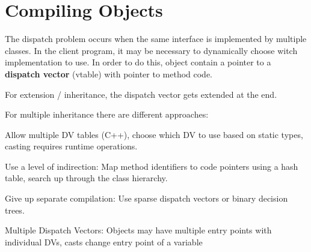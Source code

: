 \section*{Compiling Objects}

The dispatch problem occurs when the same interface is implemented by multiple classes. In the client program, it may be necessary to dynamically choose witch implementation to use. In order to do this, object contain a pointer to a \textbf{dispatch vector} (vtable) with pointer to method code. \medskip

For extension / inheritance, the dispatch vector gets extended at the end.\medskip
	
For multiple inheritance there are different approaches: 
\begin{compactitem}
	\item Allow multiple DV tables (C++), choose which DV to use based on static types, casting requires runtime operations.
			
	\item Use a level of indirection: Map method identifiers to code pointers using a hash table, search up through the class hierarchy.
			
	\item Give up separate compilation: Use sparse dispatch vectors or binary decision trees.
\end{compactitem}
	
Multiple Dispatch Vectors: Objects may have multiple entry points with individual DVs, casts change entry point of a variable

